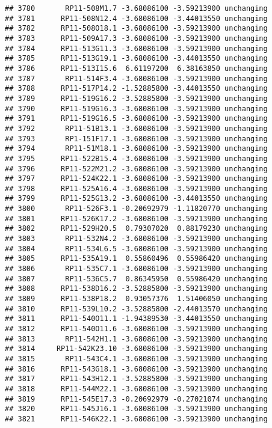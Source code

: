 \documentclass[]{article}
\begin{document}
\begin{verbatim}
## 3780       RP11-508M1.7 -3.68086100 -3.59213900 unchanging
## 3781      RP11-508N12.4 -3.68086100 -3.44013550 unchanging
## 3782      RP11-508O18.1 -3.68086100 -3.59213900 unchanging
## 3783      RP11-509A17.3 -3.68086100 -3.59213900 unchanging
## 3784      RP11-513G11.3 -3.68086100 -3.59213900 unchanging
## 3785      RP11-513G19.1 -3.68086100 -3.44013550 unchanging
## 3786      RP11-513I15.6  6.61197200  6.38163850 unchanging
## 3787       RP11-514F3.4 -3.68086100 -3.59213900 unchanging
## 3788      RP11-517P14.2 -1.52885800 -3.44013550 unchanging
## 3789      RP11-519G16.2 -3.52885800 -3.59213900 unchanging
## 3790      RP11-519G16.3 -3.68086100 -3.59213900 unchanging
## 3791      RP11-519G16.5 -3.68086100 -3.59213900 unchanging
## 3792       RP11-51B13.1 -3.68086100 -3.59213900 unchanging
## 3793       RP1-151F17.1 -3.68086100 -3.59213900 unchanging
## 3794       RP11-51M18.1 -3.68086100 -3.59213900 unchanging
## 3795      RP11-522B15.4 -3.68086100 -3.59213900 unchanging
## 3796      RP11-522M21.2 -3.68086100 -3.59213900 unchanging
## 3797      RP11-524K22.1 -3.68086100 -3.59213900 unchanging
## 3798      RP11-525A16.4 -3.68086100 -3.59213900 unchanging
## 3799      RP11-525G13.2 -3.68086100 -3.44013550 unchanging
## 3800       RP11-526F3.1 -0.20692979 -1.11820770 unchanging
## 3801      RP11-526K17.2 -3.68086100 -3.59213900 unchanging
## 3802      RP11-529H20.5  0.79307020  0.88179230 unchanging
## 3803       RP11-532N4.2 -3.68086100 -3.59213900 unchanging
## 3804       RP11-534L6.5 -3.68086100 -3.59213900 unchanging
## 3805      RP11-535A19.1  0.55860496  0.55986420 unchanging
## 3806       RP11-535C7.1 -3.68086100 -3.59213900 unchanging
## 3807       RP11-536C5.7  0.86345950  0.55986420 unchanging
## 3808      RP11-538D16.2 -3.52885800 -3.59213900 unchanging
## 3809      RP11-538P18.2  0.93057376  1.51406050 unchanging
## 3810      RP11-539L10.2 -3.52885800 -2.44013570 unchanging
## 3811      RP11-540O11.1 -1.94389530 -3.44013550 unchanging
## 3812      RP11-540O11.6 -3.68086100 -3.59213900 unchanging
## 3813       RP11-542H1.1 -3.68086100 -3.59213900 unchanging
## 3814     RP11-542K23.10 -3.68086100 -3.59213900 unchanging
## 3815       RP11-543C4.1 -3.68086100 -3.59213900 unchanging
## 3816      RP11-543G18.1 -3.68086100 -3.59213900 unchanging
## 3817      RP11-543H12.1 -3.52885800 -3.59213900 unchanging
## 3818      RP11-544M22.1 -3.68086100 -3.59213900 unchanging
## 3819      RP11-545E17.3 -0.20692979 -0.27021074 unchanging
## 3820      RP11-545J16.1 -3.68086100 -3.59213900 unchanging
## 3821      RP11-546K22.1 -3.68086100 -3.59213900 unchanging

\end{verbatim}
\end{document}

